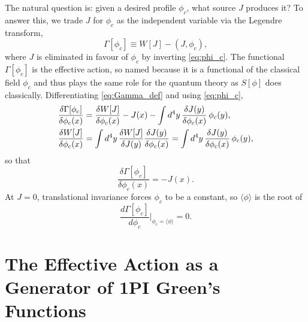 The natural question is: given a desired profile $\phi_c$, what source
$J$ produces it? To answer this, we trade $J$ for $\phi_c$ as the
independent variable via the Legendre transform,
\begin{equation}
	\Gamma[\phi_c] \equiv W[J] - (J,\phi_c),
	\label{eq:Gamma_def}
\end{equation}
where $J$ is eliminated in favour of $\phi_c$ by inverting
\eqref{eq:phi_c}. The functional $\Gamma[\phi_c]$ is the effective action,
so named because it is a functional of the classical field $\phi_c$ and
thus plays the same role for the quantum theory as $S[\phi]$ does
classically. Differentiating \eqref{eq:Gamma_def} and using
\eqref{eq:phi_c},
\begin{align}
	\frac{\delta\Gamma[\phi_c]}{\delta\phi_c(x)}
	 & = \frac{\delta W[J]}{\delta\phi_c(x)} - J(x)
	- \int d^4y\,\frac{\delta J(y)}{\delta\phi_c(x)}\,\phi_c(y), \notag \\
	\frac{\delta W[J]}{\delta\phi_c(x)}
	 & = \int d^4y\,\frac{\delta W[J]}{\delta J(y)}
	\frac{\delta J(y)}{\delta\phi_c(x)}
	= \int d^4y\,\frac{\delta J(y)}{\delta\phi_c(x)}\,\phi_c(y),
\end{align}
so that
\begin{equation}
	\frac{\delta\Gamma[\phi_c]}{\delta\phi_c(x)} = -J(x).
	\label{eq:eff_action_eom}
\end{equation}
At $J=0$, translational invariance forces $\phi_c$ to be a constant, so
$\langle\phi\rangle$ is the root of
\begin{equation}
	\frac{d\Gamma[\phi_c]}{d\phi_c}\bigg|_{\phi_c=\langle\phi\rangle} = 0.
\end{equation}

\section{The Effective Action as a Generator of 1PI Green's Functions}

